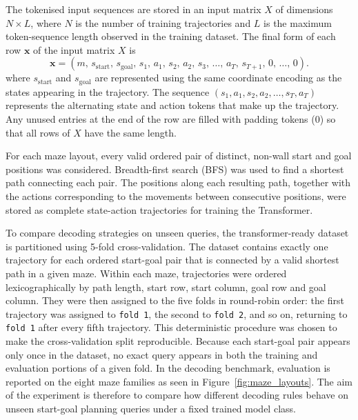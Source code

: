 ﻿\documentclass[12pt,a4paper]{article}
\theoremstyle{definition}
\begin{document}
The tokenised input sequences are stored in an input matrix $X$ of dimensions $N \times L$, 
where $N$ is the number of training trajectories and $L$ is the maximum token-sequence length 
observed in the training dataset.
The final form of each row $\boldsymbol{x}$ of the input matrix $X$ is
\begin{equation}
\boldsymbol{x}
=
(
m,\,
s_{\mathrm{start}},\,
s_{\mathrm{goal}},\,
s_1,\,
a_1,\,
s_2,\,
a_2,\,
s_3,\,
\dots,\,
a_T,\,
s_{T+1},\,
0,\,
\dots,\,
0
).
\end{equation}
where $s_{\mathrm{start}}$ and $s_{\mathrm{goal}}$ are represented using the same coordinate encoding 
as the states appearing in the trajectory. The sequence $(s_1, a_1, s_2, a_2, \dots, s_T, a_T)$ 
represents the alternating state and action tokens that make up the trajectory. Any unused entries 
at the end of the row are filled with padding tokens (0) so that all rows of $X$ have the same length.

For each maze layout, every valid ordered pair of distinct, non-wall start and
goal positions was considered. Breadth-first search (BFS) was used to find a
shortest path connecting each pair. The positions along each resulting path,
together with the actions corresponding to the movements between consecutive
positions, were stored as complete state-action trajectories for training the
Transformer. 

To compare decoding strategies on unseen queries, the transformer-ready dataset is partitioned using
5-fold cross-validation. The dataset contains exactly one trajectory for each ordered start-goal pair
that is connected by a valid shortest path in a given maze. Within each maze, trajectories were 
ordered lexicographically by path length,
start row, start column, goal row and goal column. They were then assigned to
the five folds in round-robin order: the first trajectory was assigned to \texttt{fold
1}, the second to \texttt{fold 2}, and so on, returning to \texttt{fold 1} after every fifth
trajectory. This deterministic
procedure was chosen to make the cross-validation split reproducible. Because each
start-goal pair appears only once in the dataset, no exact query appears in both the training and
evaluation portions of a given fold. In the decoding benchmark, evaluation is reported on the eight
maze families as seen in Figure~\ref{fig:maze_layouts}. The aim of the experiment is therefore to compare how different decoding 
rules behave on unseen start-goal planning queries under a fixed trained model class. 
\end{document}
